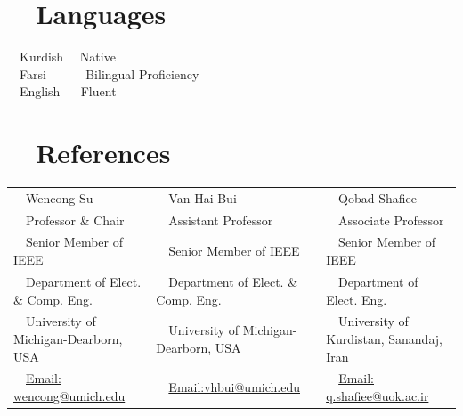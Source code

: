 \documentclass[a4paper,8pt]{article}
\begin{document}
\section{~~Languages}
~~Kurdish ~~Native\\
~~Farsi ~~~~~ Bilingual Proficiency\\
~~English ~~ Fluent\\


\vspace{-5pt}
\section{~~References}
\begin{tabular}{lll}
~~Wencong Su  &  ~~Van Hai-Bui&  ~~Qobad Shafiee\\
~~Professor \& Chair & ~~Assistant Professor & ~~Associate Professor\\
~~Senior Member of IEEE & ~~Senior Member of IEEE & ~~Senior Member of IEEE\\
~~Department of Elect. \& Comp. Eng. & ~~Department of Elect. \& Comp. Eng. & ~~Department of Elect. Eng.\\
~~University of Michigan-Dearborn, USA & ~~University of Michigan-Dearborn, USA & ~~University of Kurdistan, Sanandaj, Iran\\
~~\href{mailto:wencong@umich.edu}{Email: wencong@umich.edu} & ~~\href{mailto:vhbui@umich.edu}{Email:vhbui@umich.edu} &
~~\href{mailto:q.shafiee@uok.ac.ir}{Email: q.shafiee@uok.ac.ir}
\end{tabular}
\end{document}

